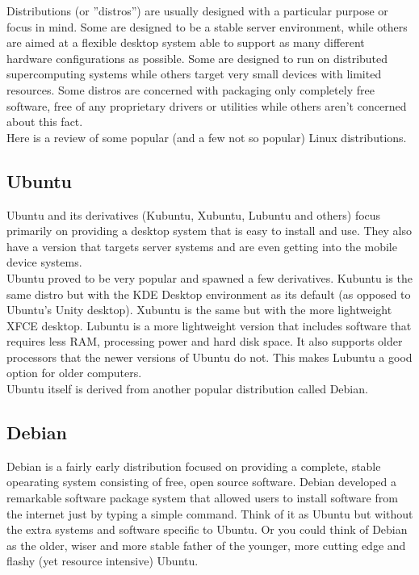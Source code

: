 Distributions (or ''distros'') are usually designed with a particular purpose or focus in mind.  Some are designed to be a stable server environment, while others are aimed at a flexible desktop system able to support as many different hardware configurations as possible.  Some are designed to run on distributed supercomputing systems while others target very small devices with limited resources.  Some distros are concerned with packaging only completely free software, free of any proprietary drivers or utilities while others aren't concerned about this fact.\\

Here is a review of some popular (and a few not so popular) Linux distributions.

\subsection{Ubuntu}

Ubuntu and its derivatives (Kubuntu, Xubuntu, Lubuntu and others) focus primarily on providing a desktop system that is easy to install and use.  They also have a version that targets server systems and are even getting into the mobile device systems.\\

Ubuntu proved to be very popular and spawned a few derivatives.  Kubuntu is the same distro but with the KDE Desktop environment as its default (as opposed to Ubuntu's Unity desktop).  Xubuntu is the same but with the more lightweight XFCE desktop.  Lubuntu is a more lightweight version that includes software that requires less RAM, processing power and hard disk space.  It also supports older processors that the newer versions of Ubuntu do not.  This makes Lubuntu a good option for older computers.\\

Ubuntu itself is derived from another popular distribution called Debian.

\subsection{Debian}

Debian is a fairly early distribution focused on providing a complete, stable opearating system consisting of free, open source software.  Debian developed a remarkable software package system that allowed users to install software from the internet just by typing a simple command.  Think of it as Ubuntu but without the extra systems and software specific to Ubuntu.  Or you could think of Debian as the older, wiser and more stable father of the younger, more cutting edge and flashy (yet resource intensive) Ubuntu.

